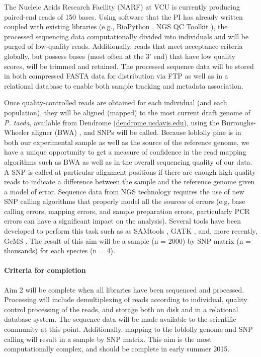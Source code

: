 The Nucleic Acids Research Facility (NARF) at VCU is currently producing paired-end reads of 150 bases.  Using software that the 
PI has already written \citep{code:2008wq} coupled with existing libraries (e.g., BioPython \citep{Cock:2009hj}, NGS QC Toolkit 
\citep{Patel:2012fq}), the processed sequencing data computationally divided into individuals and will be purged of 
low-quality reads. Additionally, reads that meet acceptance criteria globally, but possess bases (most often at the 3' end) 
that have low quality scores, will be trimmed and retained.  The processed sequence data will be stored in both compressed 
FASTA data for distribution via FTP as well as in a relational database to enable both sample tracking and metadata association.

Once quality-controlled reads are obtained for each individual (and each population), they will be aligned (mapped) to the 
most current draft genome of \emph{P. taeda}, available from Dendrome (\url{dendrome.ucdavis.edu}), using the Burroughs-Wheeler aligner 
(BWA) \citep{Li:2009fi}, and SNPs will be called.  Because loblolly pine is in both our experimental sample as well as the source 
of the reference genome, we have a unique opportunity to get a measure of confidence in the read mapping algorithms such as 
BWA as well as in the overall sequencing quality of our data.  A SNP is called at particular alignment positions if there are enough 
high quality reads to indicate a difference between the sample and the reference genome given a model of error. Sequence data 
from NGS technology requires the use of new SNP calling algorithms that properly model all the sources of errors (e.g, base 
calling errors, mapping errors, and sample preparation errors, particularly PCR errors can have a significant impact on the analysis).
Several tools have been developed to perform this task such as as SAMtools \citep{Li:2009ka}, GATK \citep{McKenna:2010bv}, and, 
more recently, GeMS \citep{You:2012iy}.   The result of this aim will be a sample (n = 2000) by SNP matrix (n = thousands) for each 
species (n = 4).  

\paragraph{Criteria for completion} Aim 2 will be complete when all libraries have been sequenced and processed.  Processing 
will include demultiplexing of reads according to individual, quality control processing of the reads, and storage both on disk and 
in a relational database system.  The sequence data will be made available to the scientific community at this point.  Additionally, 
mapping to the loblolly genome and SNP calling will result in a sample by SNP matrix.  This aim is the most computationally 
complex, and should be complete in early summer 2015.  


